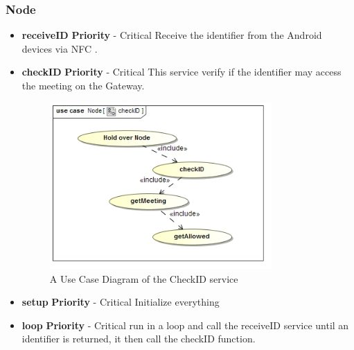 \documentclass[a4paper,12pt,titlepage]{article}
\begin{document}
		\subsubsection{Node}

		\begin{itemize}
			\item \textbf{receiveID}
				\newline\textbf{ Priority } - Critical
				\newline Receive the identifier from the Android devices via NFC .
			\item \textbf{checkID}
				\newline\textbf{ Priority } - Critical
				\newline This service verify if the identifier may access the meeting on the Gateway. 
				\begin{figure}[h!]
 					 \centering
					  \includegraphics[width=0.8\textwidth]{CheckIDUseCase}
		 			 \caption{A Use Case Diagram of the CheckID service}
				\end{figure}
			\item \textbf{setup}
				\newline\textbf{ Priority } - Critical
				\newline Initialize everything
			\item \textbf{loop}
				\newline\textbf{ Priority } - Critical
				\newline run in a loop and call the receiveID service until an identifier is returned, it then call the checkID function.

		\end{itemize}
\end{document}
